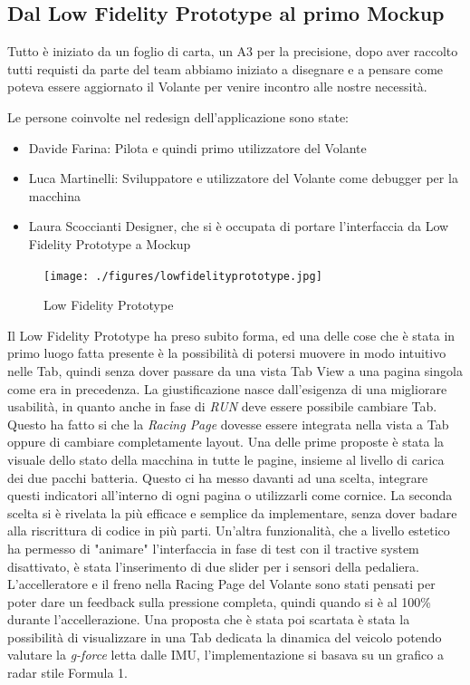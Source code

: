 \subsection{Dal Low Fidelity Prototype al primo Mockup}

Tutto è iniziato da un foglio di carta, un A3 per la precisione, dopo aver raccolto tutti requisti da parte del team
abbiamo iniziato a disegnare e a pensare come poteva essere aggiornato il Volante per venire incontro alle nostre necessità.

Le persone coinvolte nel redesign dell'applicazione sono state:

\begin{itemize}
    \item Davide Farina: Pilota e quindi primo utilizzatore del Volante
    \item Luca Martinelli: Sviluppatore e utilizzatore del Volante come debugger per la macchina
    \item Laura Scoccianti Designer, che si è occupata di portare l'interfaccia da Low Fidelity Prototype a Mockup 
\end{itemize}


\begin{figure}[hbt!]
    \centering
    \texttt{[image: ./figures/lowfidelityprototype.jpg]}
    \caption{Low Fidelity Prototype}
\end{figure}



Il Low Fidelity Prototype ha preso subito forma, ed una delle cose che è stata in primo luogo fatta presente è
la possibilità di potersi muovere in modo intuitivo nelle Tab, quindi senza dover passare da una vista Tab View a una pagina singola
come era in precedenza.
La giustificazione nasce dall'esigenza di una migliorare usabilità, in quanto anche in fase di \emph{RUN} deve essere possibile cambiare Tab.
Questo ha fatto si che la \emph{Racing Page} dovesse essere integrata nella vista a Tab oppure di cambiare completamente layout.
Una delle prime proposte è stata la visuale dello stato della macchina in tutte le pagine, insieme al livello di carica dei due pacchi 
batteria. Questo ci ha messo davanti ad una scelta, integrare questi indicatori all'interno di ogni pagina o utilizzarli come cornice. 
La seconda scelta si è rivelata la più efficace e semplice da implementare, senza dover badare alla riscrittura di codice in più parti.
Un'altra funzionalità, che a livello estetico ha permesso di "animare" l'interfaccia
in fase di test con il tractive system disattivato, è stata l'inserimento di due slider per i sensori della pedaliera.
L'accelleratore e il freno nella Racing Page del Volante sono stati pensati per poter dare un feedback sulla pressione completa, quindi quando 
si è al 100\% durante l'accellerazione.  
Una proposta che è stata poi scartata è stata la possibilità di visualizzare in una Tab dedicata la dinamica del veicolo potendo
valutare la \emph{g-force} letta dalle IMU, l'implementazione si basava su un grafico a radar stile Formula 1.

